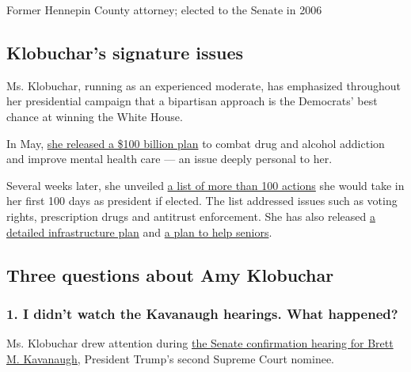 Former Hennepin County attorney; elected to the Senate in 2006

\hypertarget{klobuchars-signature-issues}{%
\subsection{Klobuchar's signature
issues}\label{klobuchars-signature-issues}}

Ms. Klobuchar, running as an experienced moderate, has emphasized
throughout her presidential campaign that a bipartisan approach is the
Democrats' best chance at winning the White House.

In May,
\href{https://www.nytimes.com/2019/05/03/us/politics/klobuchar-addiction-plan.html}{she
released a \$100 billion plan} to combat drug and alcohol addiction and
improve mental health care --- an issue deeply personal to her.

Several weeks later, she unveiled
\href{https://www.nytimes.com/2019/06/18/us/politics/klobuchar-president-plans.html}{a
list of more than 100 actions} she would take in her first 100 days as
president if elected. The list addressed issues such as voting rights,
prescription drugs and antitrust enforcement. She has also released
\href{https://medium.com/@AmyforAmerica/amys-plan-to-build-america-s-infrastructure-671b08a10751}{a
detailed infrastructure plan} and
\href{https://medium.com/@AmyforAmerica/senator-klobuchars-plan-for-seniors-efce83143761}{a
plan to help seniors}.

\hypertarget{three-questions-about-amy-klobuchar}{%
\subsection{Three questions about Amy
Klobuchar}\label{three-questions-about-amy-klobuchar}}

\hypertarget{1-i-didnt-watch-the-kavanaugh-hearings-what-happened}{%
\subsubsection{\texorpdfstring{\textbf{1. I didn't watch the Kavanaugh
hearings. What
happened?}}{1. I didn't watch the Kavanaugh hearings. What happened?}}\label{1-i-didnt-watch-the-kavanaugh-hearings-what-happened}}

Ms. Klobuchar drew attention during
\href{https://www.nytimes.com/2018/09/27/us/politics/brett-kavanaugh-confirmation-hearings.html}{the
Senate confirmation hearing for Brett M. Kavanaugh}, President Trump's
second Supreme Court nominee.

